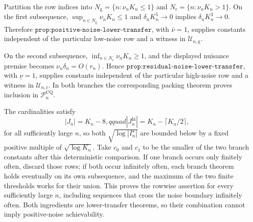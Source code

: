 Partition the row indices into \(N_{\mathrm g}=\{n:\nu_nK_n\leq1\}\) and \(N_{\mathrm r}=\{n:\nu_nK_n>1\}\).  On the first subsequence, \(\sup_{n\in N_{\mathrm g}}\nu_nK_n\leq1\) and \(\delta_nK_n^5\to0\) implies \(\delta_nK_n^3\to0\).  Therefore \(\texttt{prop:positive-noise-lower-transfer}\), with \(\bar\nu=1\), supplies constants independent of the particular low-noise row and a witness in \(\mathcal U_{n,\mathrm g}\).

On the second subsequence, \(\inf_{n\in N_{\mathrm r}}\nu_nK_n\geq1\), and the displayed nuisance premise becomes \(\nu_n\delta_n=O(r_n)\).  Hence \(\texttt{prop:residual-noise-lower-transfer}\), with \(\underline\nu=1\), supplies constants independent of the particular high-noise row and a witness in \(\mathcal U_{n,\mathrm r}\).  In both branches the corresponding packing theorem proves inclusion in \(\mathcal P_n^{\mathrm{CQ}}\).

The cardinalities satisfy
\[
 |J_n|=K_n-8,qquad |J_n^{\mathrm{hi}}|=K_n-\lceil K_n/2\rceil,
\]
for all sufficiently large \(n\), so both \(\sqrt{\log|I_n^\star|}\) are bounded below by a fixed positive multiple of \(\sqrt{\log K_n}\).  Take \(c_0\) and \(c_1\) to be the smaller of the two branch constants after this deterministic comparison.  If one branch occurs only finitely often, discard those rows; if both occur infinitely often, each branch theorem holds eventually on its own subsequence, and the maximum of the two finite thresholds works for their union.  This proves the rowwise assertion for every sufficiently large \(n\), including sequences that cross the noise boundary infinitely often.  Both ingredients are lower-transfer theorems, so their combination cannot imply positive-noise achievability.